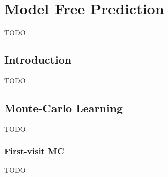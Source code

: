\section{Model Free Prediction}\label{sec:model-free-prediction}
TODO

\subsection{Introduction}\label{subsec:introduction}
TODO

\subsection{Monte-Carlo Learning}\label{subsec:monte-carlo-learning}
TODO
%
%
%
%

\subsubsection{First-visit MC}\label{subsubsec:first-visit-mc}
TODO

